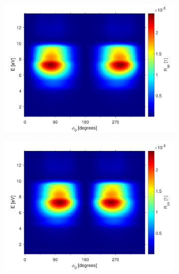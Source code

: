 \begin{figure}[h] %
    \begin{subfigure}{0.49\textwidth}
        \centering
        \includegraphics[width=\linewidth]{figures/ch4/gasb/contour/GaSbcones_Rsp.pdf}
    \end{subfigure}
    \begin{subfigure}{0.49\textwidth}
        \centering
        \includegraphics[width=\linewidth]{figures/ch4/gasb/contour/GaSbcones_Rps.pdf}
    \end{subfigure}
    

\end{figure}
